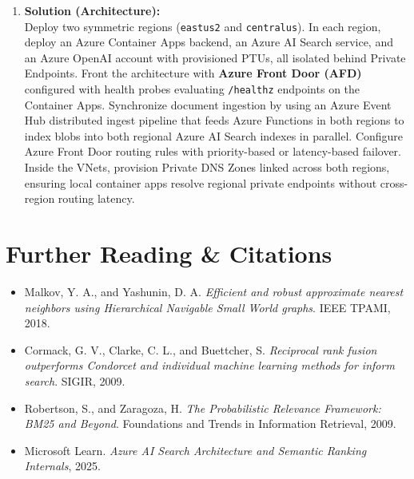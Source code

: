 \begin{enumerate}[leftmargin=18pt]
  \item \textbf{Solution (Architecture):}\\
  Deploy two symmetric regions (\texttt{eastus2} and \texttt{centralus}). In each region, deploy an Azure Container Apps backend, an Azure AI Search service, and an Azure OpenAI account with provisioned PTUs, all isolated behind Private Endpoints. Front the architecture with \textbf{Azure Front Door (AFD)} configured with health probes evaluating \texttt{/healthz} endpoints on the Container Apps. Synchronize document ingestion by using an Azure Event Hub distributed ingest pipeline that feeds Azure Functions in both regions to index blobs into both regional Azure AI Search indexes in parallel. Configure Azure Front Door routing rules with priority-based or latency-based failover. Inside the VNets, provision Private DNS Zones linked across both regions, ensuring local container apps resolve regional private endpoints without cross-region routing latency.
\end{enumerate}

\section{Further Reading \& Citations}
\begin{itemize}[leftmargin=15pt]
  \item Malkov, Y. A., and Yashunin, D. A. \emph{Efficient and robust approximate nearest neighbors using Hierarchical Navigable Small World graphs}. IEEE TPAMI, 2018.
  \item Cormack, G. V., Clarke, C. L., and Buettcher, S. \emph{Reciprocal rank fusion outperforms Condorcet and individual machine learning methods for inform search}. SIGIR, 2009.
  \item Robertson, S., and Zaragoza, H. \emph{The Probabilistic Relevance Framework: BM25 and Beyond}. Foundations and Trends in Information Retrieval, 2009.
  \item Microsoft Learn. \emph{Azure AI Search Architecture and Semantic Ranking Internals}, 2025.
\end{itemize}
